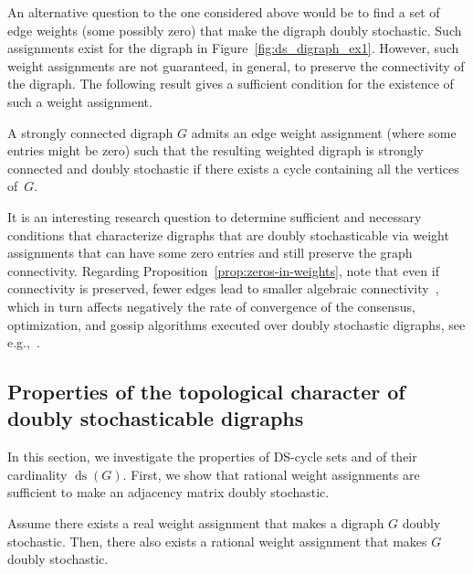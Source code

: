 \documentclass[final]{siamltex}
\begin{document}
An alternative question to the one considered above would be to find a
set of edge weights (some possibly zero) that make the digraph doubly
stochastic. Such assignments exist for the digraph in
Figure~\ref{fig:ds_digraph_ex1}.  However, such weight assignments are
not guaranteed, in general, to preserve the connectivity of the
digraph.  The following result gives a sufficient condition for the
existence of such a weight assignment.

\begin{proposition}\label{prop:zeros-in-weights}
  A strongly connected digraph $ G$ admits an edge weight assignment
  (where some entries might be zero) such that the resulting weighted
  digraph is strongly connected and doubly stochastic if there exists
  a cycle containing all the vertices of~$G$.
\end{proposition}

It is an interesting research question to determine sufficient and
necessary conditions that characterize digraphs that are doubly
stochasticable via weight assignments that can have some zero entries
and still preserve the graph connectivity.  Regarding
Proposition~\ref{prop:zeros-in-weights}, note that even if
connectivity is preserved, fewer edges lead to smaller algebraic
connectivity~\cite{CWW:05}, which in turn affects negatively the rate
of convergence of the consensus, optimization, and gossip algorithms
executed over doubly stochastic digraphs, see
e.g.,~\cite{SB-AG-BP-DS:06,JL-ASM-BDOA-CY:09,MC-CWW:07,AG-SB:06}.

\subsection{Properties of the topological character of doubly
  stochasticable digraphs}\label{section:top_char}
In this section, we investigate the properties of DS-cycle sets and of
their cardinality $ {\operatorname{ds}}(G) $. First, we show that rational weight
assignments are sufficient to make an adjacency matrix doubly
stochastic.

\begin{lemma}\label{le:real_rational_ds}
  Assume there exists a real weight assignment that makes a digraph
  $G$ doubly stochastic. Then, there also exists a rational weight
  assignment that makes $ G $ doubly stochastic.
\end{lemma}
\end{document}
